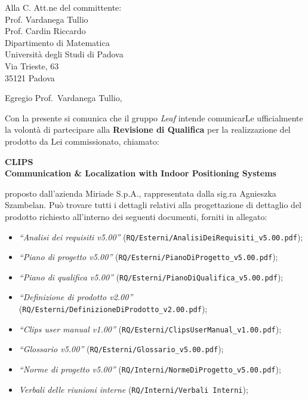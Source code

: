 \documentclass[a4paper,12pt]{letteracdp}
\author{Davide Castello}
\date{16 maggio 2016}
\begin{document}
	\begin{letter}{
		Alla C. Att.ne del committente: \\
		Prof. Vardanega Tullio \\
		Prof. Cardin Riccardo \\
		Dipartimento di Matematica \\
		Università degli Studi di Padova \\
		Via Trieste, 63 \\
		35121 Padova}
		
		\opening{Egregio Prof.~Vardanega Tullio,}
		Con la presente si comunica che il gruppo \textit{Leaf} intende comunicarLe ufficialmente la volontà di partecipare alla \textbf{Revisione di Qualifica} per la realizzazione del prodotto da Lei commissionato, chiamato:
\begin{center}
	\textbf{CLIPS \\ Communication \& Localization with Indoor Positioning Systems}
\end{center}
proposto dall'azienda Miriade S.p.A., rappresentata dalla sig.ra Agnieszka Szambelan.
Può trovare tutti i dettagli relativi alla progettazione di dettaglio del prodotto richiesto all'interno dei seguenti documenti, forniti in allegato:
%
\begin{itemize}
	\item \textit{“Analisi dei requisiti v5.00”} (\texttt{RQ/Esterni/AnalisiDeiRequisiti\_v5.00.pdf});

	\item \textit{“Piano di progetto v5.00”} (\texttt{RQ/Esterni/PianoDiProgetto\_v5.00.pdf});

	\item \textit{“Piano di qualifica v5.00”} (\texttt{RQ/Esterni/PianoDiQualifica\_v5.00.pdf});
	
	\item \textit{“Definizione di prodotto v2.00”} (\texttt{RQ/Esterni/DefinizioneDiProdotto\_v2.00.pdf});
	
	\item \textit{“Clips user manual v1.00”} (\texttt{RQ/Esterni/ClipsUserManual\_v1.00.pdf});
	
	\item \textit{“Glossario v5.00”} (\texttt{RQ/Esterni/Glossario\_v5.00.pdf});
	
	\item \textit{“Norme di progetto v5.00”} (\texttt{RQ/Interni/NormeDiProgetto\_v5.00.pdf});

	\item \textit{Verbali delle riunioni interne}	(\texttt{RQ/Interni/Verbali Interni});
	

\end{itemize}
\end{letter}
\end{document}
